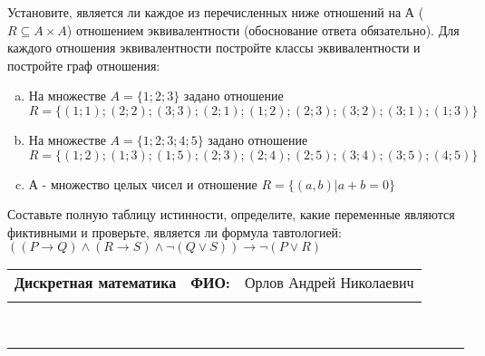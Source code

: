 \documentclass[10pt]{exam}
\newcommand{\class}{Дискретная математика}
\newcommand{\examdate}{}
\begin{document}
\begin{questions}
\question
Установите, является ли каждое из перечисленных ниже отношений на А ($R \subseteq A \times A$) отношением эквивалентности (обоснование ответа обязательно). Для каждого отношения эквивалентности постройте классы 
эквивалентности и постройте граф отношения:
\begin{enumerate} [a)]\setcounter{enumi}{0}
\item На множестве $A = \{1; 2; 3\}$ задано отношение $R = \{(1; 1); (2; 2); (3; 3); (2; 1); (1; 2); (2; 3); (3; 2); (3; 1); (1; 3)\}$
\item На множестве $A = \{1; 2; 3; 4; 5\}$ задано отношение $R = \{(1; 2); (1; 3); (1; 5); (2; 3); (2; 4); (2; 5); (3; 4); (3; 5); (4; 5)\}$
\item А - множество целых чисел и отношение $R = \{(a,b)|a + b = 0\}$
\end{enumerate}\question Составьте полную таблицу истинности, определите, какие переменные являются фиктивными и проверьте, является ли формула тавтологией:
$((P \rightarrow Q) \land (R \rightarrow S) \land \neg (Q \lor S)) \rightarrow \neg (P \lor R)$

\end{questions}
\newpage
\begin{flushright}
\begin{tabular}{p{2.8in} r l}
\textbf{\class} & \textbf{ФИО:} &Орлов Андрей Николаевич
\\

\textbf{\examdate} &&\\
\end{tabular}\\
\end{flushright}
\rule[1ex]{\textwidth}{.1pt}
\end{document}
